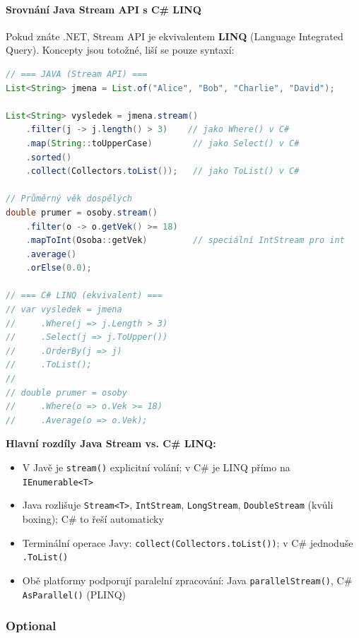 \paragraph{Srovnání Java Stream API s C\# LINQ}

Pokud znáte .NET, Stream API je ekvivalentem \textbf{LINQ} (Language Integrated Query).
Koncepty jsou totožné, liší se pouze syntaxí:

\begin{lstlisting}[language=Java, caption=Java Stream API vs. C\# LINQ -- srovnání]
// === JAVA (Stream API) ===
List<String> jmena = List.of("Alice", "Bob", "Charlie", "David");

List<String> vysledek = jmena.stream()
    .filter(j -> j.length() > 3)    // jako Where() v C#
    .map(String::toUpperCase)        // jako Select() v C#
    .sorted()
    .collect(Collectors.toList());   // jako ToList() v C#

// Průměrný věk dospělých
double prumer = osoby.stream()
    .filter(o -> o.getVek() >= 18)
    .mapToInt(Osoba::getVek)         // speciální IntStream pro int
    .average()
    .orElse(0.0);

// === C# LINQ (ekvivalent) ===
// var vysledek = jmena
//     .Where(j => j.Length > 3)
//     .Select(j => j.ToUpper())
//     .OrderBy(j => j)
//     .ToList();
//
// double prumer = osoby
//     .Where(o => o.Vek >= 18)
//     .Average(o => o.Vek);
\end{lstlisting}

\textbf{Hlavní rozdíly Java Stream vs. C\# LINQ:}
\begin{itemize}
  \item V Javě je \texttt{stream()} explicitní volání; v C\# je LINQ přímo na \texttt{IEnumerable<T>}
  \item Java rozlišuje \texttt{Stream<T>}, \texttt{IntStream}, \texttt{LongStream}, \texttt{DoubleStream} (kvůli boxing); C\# to řeší automaticky
  \item Terminální operace Javy: \texttt{collect(Collectors.toList())}; v C\# jednoduše \texttt{.ToList()}
  \item Obě platformy podporují paralelní zpracování: Java \texttt{parallelStream()}, C\# \texttt{AsParallel()} (PLINQ)
\end{itemize}

\subsubsection{Optional}

